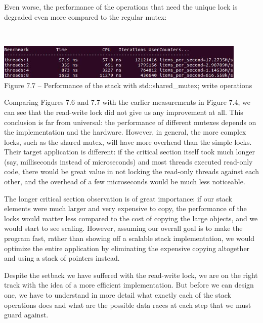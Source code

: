 Even worse, the performance of the operations that need the unique lock is degraded even more compared to the regular mutex:

\hspace*{\fill} \\ %
\begin{center}
\includegraphics[width=0.9\textwidth]{content/2/chapter7/images/7.jpg}\\
Figure 7.7 – Performance of the stack with std::shared\_mutex; write operations
\end{center}

Comparing Figures 7.6 and 7.7 with the earlier measurements in Figure 7.4, we can see that the read-write lock did not give us any improvement at all. This conclusion is far from universal: the performance of different mutexes depends on the implementation and the hardware. However, in general, the more complex locks, such as the shared mutex, will have more overhead than the simple locks. Their target application is different: if the critical section itself took much longer (say, milliseconds instead of microseconds) and most threads executed read-only code, there would be great value in not locking the read-only threads against each other, and the overhead of a few microseconds would be much less noticeable.

The longer critical section observation is of great importance: if our stack elements were much larger and very expensive to copy, the performance of the locks would matter less compared to the cost of copying the large objects, and we would start to see scaling. However, assuming our overall goal is to make the program fast, rather than showing off a scalable stack implementation, we would optimize the entire application by eliminating the expensive copying altogether and using a stack of pointers instead.

Despite the setback we have suffered with the read-write lock, we are on the right track with the idea of a more efficient implementation. But before we can design one, we have to understand in more detail what exactly each of the stack operations does and what are the possible data races at each step that we must guard against.



